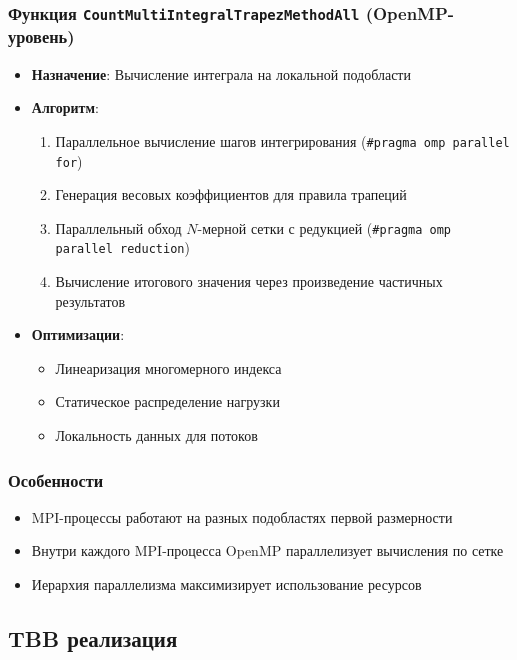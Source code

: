 \documentclass[12pt]{article}
\begin{document}
\subsubsection*{Функция \texttt{CountMultiIntegralTrapezMethodAll} (OpenMP-уровень)}
\begin{itemize}
  \item \textbf{Назначение}: Вычисление интеграла на локальной подобласти
  \item \textbf{Алгоритм}:
  \begin{enumerate}
    \item Параллельное вычисление шагов интегрирования (\texttt{\#pragma omp parallel for})
    \item Генерация весовых коэффициентов для правила трапеций
    \item Параллельный обход $N$-мерной сетки с редукцией (\texttt{\#pragma omp parallel reduction})
    \item Вычисление итогового значения через произведение частичных результатов
  \end{enumerate}
  \item \textbf{Оптимизации}:
  \begin{itemize}
    \item Линеаризация многомерного индекса
    \item Статическое распределение нагрузки
    \item Локальность данных для потоков
  \end{itemize}
\end{itemize}

\subsubsection*{Особенности}
\begin{itemize}
  \item MPI-процессы работают на разных подобластях первой размерности
  \item Внутри каждого MPI-процесса OpenMP параллелизует вычисления по сетке
  \item Иерархия параллелизма максимизирует использование ресурсов
\end{itemize}

\subsection{TBB реализация}
\end{document}
